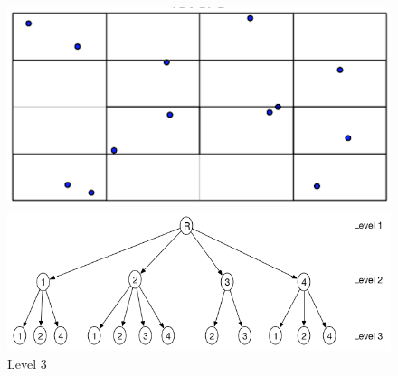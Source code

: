 \documentclass{article}
\begin{document}
\begin{figure}[ht]

  \centering
  \begin{minipage}[b]{0.35\textwidth}
    \includegraphics[width=\textwidth]{Quadtree_basic_scenario3}
  \end{minipage}
  \hfill
  \begin{minipage}[b]{0.6\textwidth}
    \includegraphics[width=\textwidth]{1_1Quad_3_tree}
  \end{minipage}
  \caption{Level 3}
\end{figure}
\end{document}
